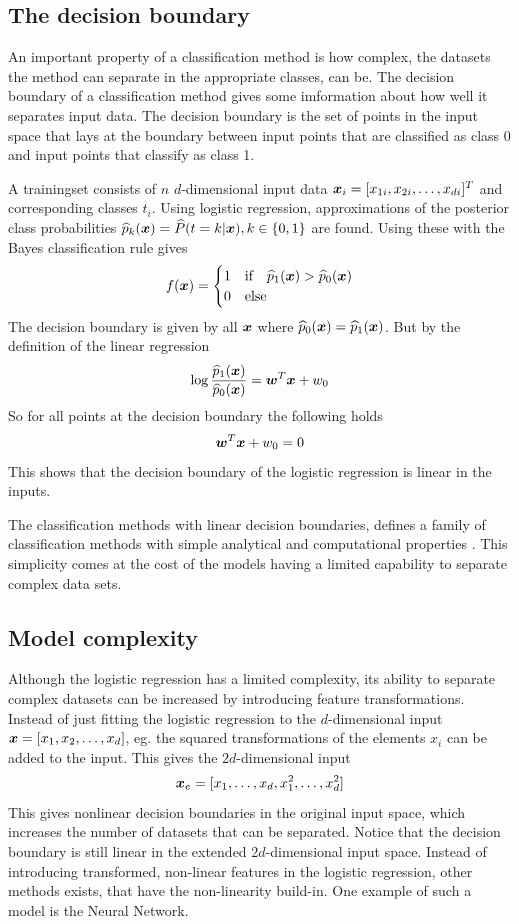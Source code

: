\subsection{The decision boundary}
An important property of a classification method is how complex, the datasets the method can separate in the appropriate classes, can be. The decision boundary of a classification method gives some imformation about how well it separates input data. The decision boundary is the set of points in the input space that lays at the boundary between input points that are classified as class 0 and input points that classify as class 1.
\begin{Exa}
    A trainingset consists of $n$ $d$-dimensional input data $\boldsymbol{x}_i=[x_{1i}, x_{2i}, \dots, x_{di}]^T$ and corresponding classes $t_i$. Using logistic regression, approximations of the posterior class probabilities $\widehat{p}_k(\boldsymbol{x})=\widehat{P}(t=k|\boldsymbol{x}), k\in\{0,1\}$ are found. Using these with the Bayes classification rule gives
    \[
        f(\boldsymbol{x}) = \begin{cases}
            1 & \text{if}\quad \widehat{p}_1(\boldsymbol{x})>\widehat{p}_0(\boldsymbol{x}) \\
            0 & \text{else}
        \end{cases}
    \]
    The decision boundary is given by all $\boldsymbol{x}$ where $\widehat{p}_0(\boldsymbol{x})=\widehat{p}_1(\boldsymbol{x})$. But by the definition of the linear regression
    \[
        \log\frac{\widehat{p}_1(\boldsymbol{x})}{\widehat{p}_0(\boldsymbol{x})} = \boldsymbol{w}^T\boldsymbol{x}+w_0
    \]
    So for all points at the decision boundary the following holds
    \[
        \boldsymbol{w}^T\boldsymbol{x}+w_0 = 0
    \]
    This shows that the decision boundary of the logistic regression is linear in the inputs.
\end{Exa}
The classification methods with linear decision boundaries, defines a family of classification methods with simple analytical and computational properties \citep[p.179]{bishop}. This simplicity comes at the cost of the models having a limited capability to separate complex data sets. 

\subsection{Model complexity}\label{sec:logistic-complexity}
Although the logistic regression has a limited complexity, its ability to separate complex datasets can be increased by introducing feature transformations. Instead of just fitting the logistic regression to the $d$-dimensional input $\boldsymbol{x}=[x_1, x_2, \dots, x_d]$, eg. the squared transformations of the elements $x_i$ can be added to the input. This gives the $2d$-dimensional input 
\[
    \boldsymbol{x}_e = [x_1, \dots, x_d, x_1^2, \dots, x_d^2]
\]
This gives nonlinear decision boundaries in the original input space, which increases the number of datasets that can be separated. Notice that the decision boundary is still linear in the extended $2d$-dimensional input space. Instead of introducing transformed, non-linear features in the logistic regression, other methods exists, that have the non-linearity build-in. One example of such a model is the Neural Network.


